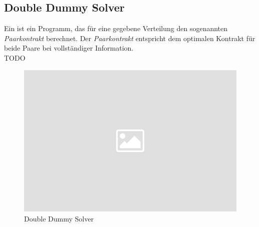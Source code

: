 \subsection{Double Dummy Solver}\label{solver}

\noindent
Ein \dds ist ein Programm, das für eine gegebene Verteilung den sogenannten
\textit{Paarkontrakt} berechnet. Der \textit{Paarkontrakt} entspricht dem
optimalen Kontrakt für beide Paare bei vollständiger Information.\\[.1cm]

\noindent
TODO

\noindent
\begin{figure}[ht]
	\centering
  \includegraphics[width=16cm]{pictures/placeholder.png}
	\caption{Double Dummy Solver}
	\label{pic/dds}
\end{figure}
